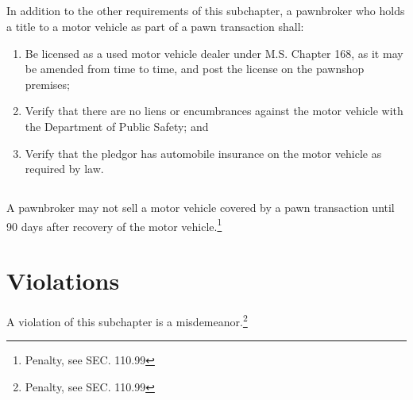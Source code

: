 \subsection{}
In addition to the other requirements of this subchapter, a pawnbroker who holds a title to a motor vehicle as part of a pawn transaction shall:
\begin{enumerate}[{\indent}1)]
    \item Be licensed as a used motor vehicle dealer under M.S. Chapter 168, as it may be amended from time to time, and post the license on the pawnshop premises;
    \item Verify that there are no liens or encumbrances against the motor vehicle with the Department of Public Safety; and
    \item Verify that the pledgor has automobile insurance on the motor vehicle as required by law.
\end{enumerate}
\subsection{}
A pawnbroker may not sell a motor vehicle covered by a pawn transaction until 90 days after recovery of the motor vehicle.\footnote{Penalty, see SEC. 110.99}

\section{Violations}
A violation of this subchapter is a misdemeanor.\footnote{Penalty, see SEC. 110.99}
